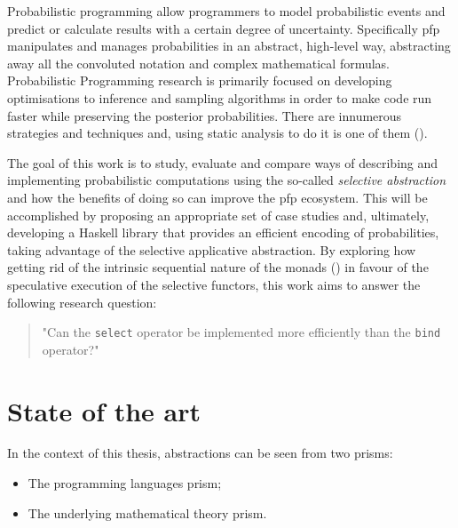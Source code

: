 \documentclass[
  oneside,
  11pt, a4paper,
  footinclude=true,
  headinclude=true,
  cleardoublepage=empty
]{scrbook}
\theoremstyle{definition}
\theoremstyle{definition}
\begin{document}
	    Probabilistic programming allow programmers to model probabilistic events and predict or calculate results with a certain degree of uncertainty. Specifically \gls{pfp} manipulates and manages probabilities in an abstract, high-level way, abstracting away all the convoluted notation and complex mathematical formulas. Probabilistic Programming research is primarily focused on developing optimisations to inference and sampling algorithms in order to make code run faster while preserving the posterior probabilities. There are innumerous strategies and techniques and, using static analysis to do it is one of them (\cite{bernstein2019static}).
    
        The goal of this work is to study, evaluate and compare ways of describing and implementing probabilistic computations using the so-called \emph{selective abstraction} and how the benefits of doing so can improve the \gls{pfp} ecosystem. This will be accomplished by proposing an appropriate set of case studies and, ultimately, developing a Haskell library that provides an efficient encoding of probabilities, taking advantage of the selective applicative abstraction. By exploring how getting rid of the intrinsic sequential nature of the monads (\cite{Scibior:2015:PPP:2887747.2804317}) in favour of the speculative execution of the selective functors, this work aims to answer the following research question:
        \begin{quote}
        "Can the \texttt{select} operator be implemented more efficiently than the \texttt{bind} operator?"
        \end{quote}

		
	\section{State of the art}\label{sec-state-art}
	    In the context of this thesis, abstractions can be seen from two prisms:
	    \begin{itemize}
	        \item The programming languages prism;
	        \item The underlying mathematical theory prism.
	    \end{itemize}{}
	    
\end{document}
